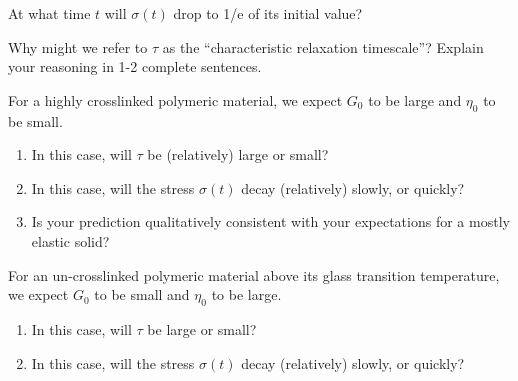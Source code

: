 \begin{activity}
\begin{ctqs}
					\begin{solution}[0.75in]
					\end{solution}
		
		\question At what time $t$ will $\sigma(t)$ drop to 1/e of its initial value?
	
					\begin{solution}[1.5in]
					\end{solution}
		
		\question Why might we refer to $\tau$ as the ``characteristic relaxation timescale''?  Explain your reasoning in 1-2 complete sentences.
	
					\begin{solution}[1.5in]
					\end{solution}
		
		\question For a highly crosslinked polymeric material, we expect $G_0$ to be large and $\eta_0$ to be small.
			\begin{enumerate}
				\item In this case, will $\tau$ be (relatively) large or small?  
	
					\begin{solution}[1in]
					\end{solution}
				\item In this case, will the stress $\sigma(t)$ decay (relatively) slowly, or quickly?
	
					\begin{solution}[1.25in]
					\end{solution}
				\item Is your prediction qualitatively consistent with your expectations for a mostly elastic solid?
	
					\begin{solution}[1in]
					\end{solution}
			\end{enumerate}
		
		\question For an un-crosslinked polymeric material above its glass transition temperature, we expect $G_0$ to be small and $\eta_0$ to be large.
			\begin{enumerate}
				\item In this case, will $\tau$ be large or small?  
	
					\begin{solution}[1.25in]
					\end{solution}
				\item In this case, will the stress $\sigma(t)$ decay (relatively) slowly, or quickly?
	

\end{enumerate}
\end{ctqs}
\end{activity}
